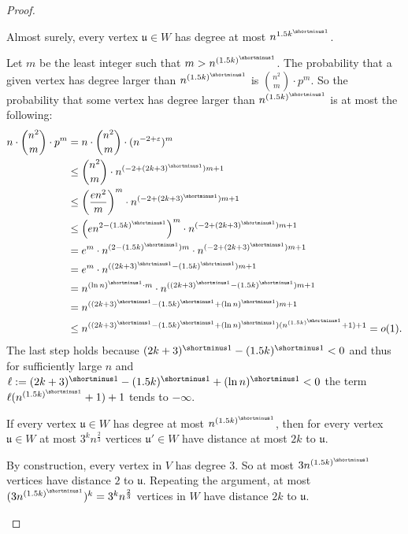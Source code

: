\documentclass[]{lmcs}
\renewcommand{\epsilon}{\varepsilon}
\newcommand{\inv}[1]{#1^{\shortminus 1}}
\newcommand{\bVertA}{\mathfrak{u}}
\newcommand{\gadgetsb}{V}
\newcommand{\feetb}{W}
\newenvironment{claimproof}[1][\proofname]{\begin{claimprooftemp}[#1]\renewcommand*{\qedsymbol}{\(\dashv\)}}{\end{claimprooftemp}}
\begin{document}
\begin{proof}
	\begin{clm}
		\label{clm:almost-sure-degree}
		Almost surely, every vertex $\bVertA \in \feetb$ has degree at most $n^{\inv{1.5k}}$.
	\end{clm}
	\begin{claimproof}
		Let $m$ be the least integer such that $m > n^{\inv{(1.5k)}}$.
		The probability that a given vertex has degree larger than $n^{\inv{(1.5k)}}$ is $\binom{n^2}{m} \cdot p ^{m}$.
		So the probability that some vertex has degree larger than $n^{\inv{(1.5k)}}$ is at most the following: 
		\begin{align*}
			n \cdot \binom{n^2}{m} \cdot p ^{m} &= n \cdot \binom{n^2}{m} \cdot (n^{-2+\epsilon})^m \\
			&\leq \binom{n^2}{m} \cdot n^{(-2 + \inv{(2k+3)})m + 1}\\
			&\leq \left(\frac{e n^2}{m}\right)^m \cdot n^{(-2 + \inv{(2k+3)})m + 1}\\
			&\leq \left(e n^{2-\inv{(1.5k)}}\right)^m \cdot n^{(-2 + \inv{(2k+3)})m + 1}\\
			&= e^m \cdot n^{(2-\inv{(1.5k)})m}\cdot n^{(-2 + \inv{(2k+3)})m + 1}\\
			&= e^m \cdot n^{(\inv{(2k+3)}-\inv{(1.5k)})m +1}\\
			&= n^{\inv{(\ln n)}\cdot m} \cdot n^{(\inv{(2k+3)}-\inv{(1.5k)})m +1}\\
			& = n ^ {(\inv{(2k+3)} -\inv{(1.5k)} + \inv{(\ln n)})m +1}\\
			&\leq n ^ {(\inv{(2k+3)} -\inv{(1.5k)} + \inv{(\ln n)})(n^{\inv{(1.5k)}}+1) +1}
			= o(1).
		\end{align*}
		The last step holds because $\inv{(2k+3)} -\inv{(1.5k)} < 0$  and thus for sufficiently large $n$ and
		$\ell := \inv{(2k+3)} - \inv{(1.5k)} + \inv{(\ln n)}<0$
		the term $\ell(n^{\inv{(1.5k)}}+1) +1$ tends to $-\infty$.
	\end{claimproof}
	\begin{clm}
		\label{ref:claim-distance}
		If every vertex $\bVertA \in \feetb$ has  degree at most $n^{\inv{(1.5k)}}$,
		then for every vertex $\bVertA \in \feetb$ at most $3^kn^{\frac{2}{3}}$  vertices $\bVertA'\in\feetb$
		have distance at most $2k$ to $\bVertA$.
	\end{clm}
	\begin{claimproof}
		By construction, every vertex in $\gadgetsb$ has degree $3$.
		So at most $3n^{\inv{(1.5k)}}$ vertices have distance $2$ to $\bVertA$.
		Repeating the argument, 
		at most $(3n^{\inv{(1.5k)}})^k = 3^k n^{\frac{2}{3}}$
		vertices in $\feetb$ have distance $2k$ to $\bVertA$.
	\end{claimproof}
	

\end{proof}
\end{document}
